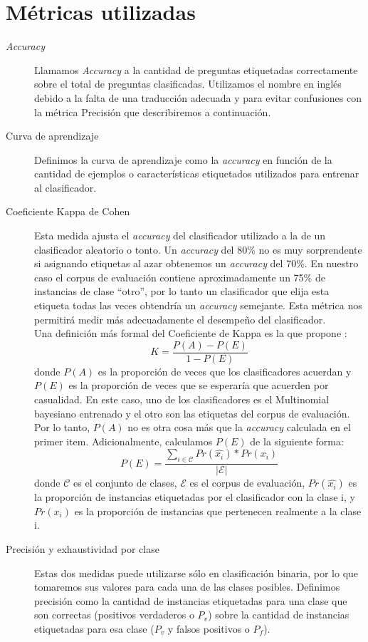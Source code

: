 \section{Métricas utilizadas}
\begin{description}
    \item[\textit{Accuracy}] Llamamos \textit{Accuracy} a la cantidad de preguntas etiquetadas correctamente sobre el total de preguntas clasificadas. Utilizamos el nombre en inglés debido a la falta de una traducción adecuada y para evitar confusiones con la métrica Precisión que describiremos a continuación.
    \item[Curva de aprendizaje] Definimos la curva de aprendizaje como la \textit{accuracy} en función de la cantidad de ejemplos o características etiquetados utilizados para entrenar al clasificador.
    \item [Coeficiente Kappa de Cohen] Esta medida ajusta el \textit{accuracy} del clasificador utilizado a la de un clasificador aleatorio o tonto. Un \textit{accuracy} del 80\% no es muy sorprendente si asignando etiquetas al azar obtenemos un \textit{accuracy} del 70\%. En nuestro caso el corpus de evaluación contiene aproximadamente un 75\% de instancias de clase ``otro'', por lo tanto un clasificador que elija esta etiqueta todas las veces obtendría un \textit{accuracy} semejante. Esta métrica nos permitirá medir más adecuadamente el desempeño del clasificador.\\
    Una definición más formal del Coeficiente de Kappa es la que propone \citet{KappaCarletta}:
    $$K = \frac{P(A)-P(E)}{1-P(E)}$$
    donde $P(A)$ es la proporción de veces que los clasificadores acuerdan y $P(E)$ es la proporción de veces que se esperaría que acuerden por casualidad. En este caso, uno de los clasificadores es el Multinomial bayesiano entrenado y el otro son las etiquetas del corpus de evaluación. Por lo tanto, $P(A)$ no es otra cosa más que la \textit{accuracy} calculada en el primer item. Adicionalmente, calculamos $P(E)$ de la siguiente forma:
    $$P(E) = \frac{\sum_{i\in\mathcal{C}}Pr(\hat{x_i})*Pr(x_i)}{|\mathcal{E}|}$$
    donde $\mathcal{C}$ es el conjunto de clases, $\mathcal{E}$ es el corpus de evaluación, $Pr(\hat{x_i})$ es la proporción de instancias etiquetadas por el clasificador con la clase i, y $Pr(x_i)$ es la proporción de instancias que pertenecen realmente a la clase i.
    \item [Precisión y exhaustividad por clase] Estas dos medidas puede utilizarse sólo en clasificación binaria, por lo que tomaremos sus valores para cada una de las clases posibles. Definimos precisión como la cantidad de instancias etiquetadas para una clase que son correctas (positivos verdaderos o $P_v$) sobre la cantidad de instancias etiquetadas para esa clase ($P_v$ y falsos positivos o $P_f$).

\end{description}

